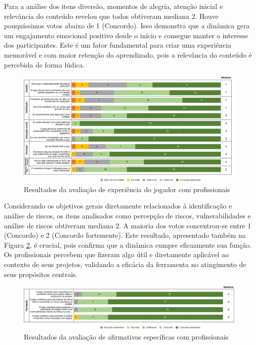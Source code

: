 \documentclass[
	12pt,
	openright,
	twoside,
	a4paper,
	english,
	brazil
	]{abntex2}
\begin{document}
Para a análise dos itens diversão, momentos de alegria, atenção inicial e relevância do conteúdo revelou que todos obtiveram mediana 2. Houve pouquíssimos votos abaixo de 1 (Concordo). Isso demonstra que a dinâmica gera um engajamento emocional positivo desde o início e consegue manter o interesse dos participantes. Este é um fator fundamental para criar uma experiência memorável e com maior retenção do aprendizado, pois a relevância do conteúdo é percebida de forma lúdica.

\begin{figure}[H]
	\caption{\label{bridge-xp-jogador} Resultados da avaliação de experiência do jogador com profissionais}
  \includegraphics[width=\textwidth]{bridge-xp-jogador}
\end{figure}

Considerando os objetivos gerais diretamente relacionados à identificação e análise de riscos, os itens analisados como percepção de riscos, vulnerabilidades e análise de riscos obtiveram mediana 2. A maioria dos votos concentrou-se entre 1 (Concordo) e 2 (Concordo fortemente). Este resultado, apresentado também na Figura \ref{bridge-afirmativas}, é crucial, pois confirma que a dinâmica cumpre eficazmente sua função. Os profissionais percebem que fizeram algo útil e diretamente aplicável ao contexto de seus projetos, validando a eficácia da ferramenta no atingimento de seus propósitos centrais.

\begin{figure}[H]
	\caption{\label{bridge-afirmativas} Resultados da avaliação de afirmativas específicas com profissionais}
  \includegraphics[width=\textwidth]{bridge-afirmativas}
\end{figure}
\end{document}
